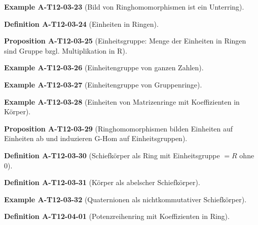 \documentclass[10pt, letterpaper]{article}
\newcommand{\CustomHeading}[3]{%
  \par\medskip\noindent%
  \textbf{#1 #2} \textnormal{(#3)}.\enskip%
}
\newenvironment{DEF}[2]{\CustomHeading{Definition}{#1}{#2}}{}
\newenvironment{PROP}[2]{\CustomHeading{Proposition}{#1}{#2}}{}
\newenvironment{EXA}[2]{\CustomHeading{Example}{#1}{#2}}{}
\begin{document}
\begin{EXA}{A-T12-03-23}{Bild von Ringhomomorphismen ist ein Unterring}
\end{EXA}

\begin{DEF}{A-T12-03-24}{Einheiten in Ringen}
\end{DEF}

\begin{PROP}{A-T12-03-25}{Einheitsgruppe: Menge der Einheiten in Ringen sind Gruppe bzgl. Multiplikation in R}
\end{PROP}

\begin{EXA}{A-T12-03-26}{Einheitengruppe von ganzen Zahlen}
\end{EXA}

\begin{EXA}{A-T12-03-27}{Einheitengruppe von Gruppenringe}
\end{EXA}

\begin{EXA}{A-T12-03-28}{Einheiten von Matrizenringe mit Koeffizienten in Körper}
\end{EXA}

\begin{PROP}{A-T12-03-29}{Ringhomomorphismen bilden Einheiten auf Einheiten ab und induzieren G-Hom auf Einheitsgruppen}
\end{PROP}

\begin{DEF}{A-T12-03-30}{Schiefkörper als Ring mit Einheitsgruppe $= R$ ohne $0$}
\end{DEF}

\begin{DEF}{A-T12-03-31}{Körper als abelscher Schiefkörper}
\end{DEF}

\begin{EXA}{A-T12-03-32}{Quaternionen als nichtkommutativer Schiefkörper}
\end{EXA}

\begin{DEF}{A-T12-04-01}{Potenzreihenring mit Koeffizienten in Ring}
\end{DEF}
\end{document}
